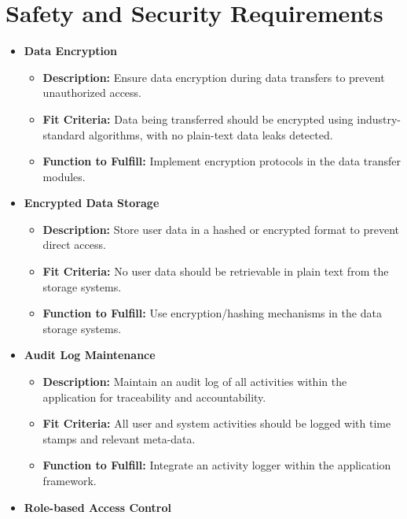 \documentclass{article}
\newcounter{srnum} %
\newcommand{\rthesrnum}{SR\refstepcounter{srnum}\thesrnum:}
\begin{document}
  \pagestyle{plain}%
  \clearpage %

\section{Safety and Security Requirements}
\begin{itemize}
\item [\rthesrnum \label{Data_Encryption}] \textbf{Data Encryption}
  \begin{itemize}
  \item \textbf{Description:} Ensure data encryption during data transfers to prevent unauthorized access.
  \item \textbf{Fit Criteria:} Data being transferred should be encrypted using industry-standard algorithms, with no plain-text data leaks detected.
  \item \textbf{Function to Fulfill:} Implement encryption protocols in the data transfer modules.
  \end{itemize}
\item [\rthesrnum \label{Encrypted_Data_Storage}] \textbf{Encrypted Data Storage}
  \begin{itemize}
  \item \textbf{Description:} Store user data in a hashed or encrypted format to prevent direct access.
  \item \textbf{Fit Criteria:} No user data should be retrievable in plain text from the storage systems.
  \item \textbf{Function to Fulfill:} Use encryption/hashing mechanisms in the data storage systems.
  \end{itemize}
\item [\rthesrnum \label{Audit_Log_Maintenance}] \textbf{Audit Log Maintenance}
  \begin{itemize}
  \item \textbf{Description:} Maintain an audit log of all activities within the application for traceability and accountability.
  \item \textbf{Fit Criteria:} All user and system activities should be logged with time stamps and relevant meta-data.
  \item \textbf{Function to Fulfill:} Integrate an activity logger within the application framework.
  \end{itemize}
\item [\rthesrnum \label{Role-based_Access_Control}] \textbf{Role-based Access Control}
  \begin{itemize}

\end{itemize}
\end{itemize}
\end{document}
